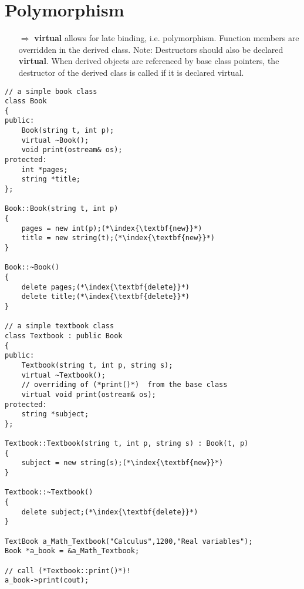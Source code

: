 \documentclass[10pt]{article}
\begin{document}
\section{Polymorphism}
\small
\begin{enumerate}
\item[$\Rightarrow$] \textbf{virtual} allows for late binding, i.e.
polymorphism. Function members are
overridden in the derived class. Note: Destructors should also be
 declared \textbf{virtual}. When derived
objects are referenced by base class
pointers, the destructor of the derived class
is called if it is declared virtual.
\end{enumerate}
\begin{lstlisting}
// a simple book class
class Book
{
public:
    Book(string t, int p);
    virtual ~Book();
    void print(ostream& os);
protected:
    int *pages;
    string *title;
};

Book::Book(string t, int p)
{
    pages = new int(p);(*\index{\textbf{new}}*)
    title = new string(t);(*\index{\textbf{new}}*)
}

Book::~Book()
{
    delete pages;(*\index{\textbf{delete}}*)
    delete title;(*\index{\textbf{delete}}*)
}

// a simple textbook class
class Textbook : public Book
{
public:
    Textbook(string t, int p, string s);
    virtual ~Textbook();
    // overriding of (*print()*)  from the base class
    virtual void print(ostream& os);
protected:
    string *subject;
};

Textbook::Textbook(string t, int p, string s) : Book(t, p)
{
    subject = new string(s);(*\index{\textbf{new}}*)
}

Textbook::~Textbook()
{
    delete subject;(*\index{\textbf{delete}}*)
}

TextBook a_Math_Textbook("Calculus",1200,"Real variables");
Book *a_book = &a_Math_Textbook;

// call (*Textbook::print()*)!
a_book->print(cout);
\end{lstlisting}
%
%
\end{document}
